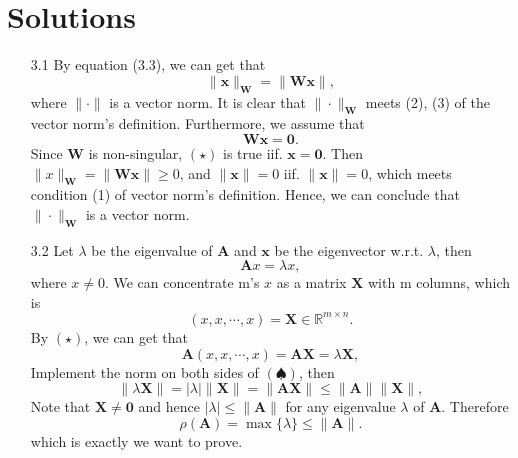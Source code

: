 \section{Solutions}
\begin{enumerate}
    \item[3.1] {
    By equation (3.3), we can get that
    $$
         \| \bm{x} \|_{\bm{W}} = \|\bm{Wx} \|,
    $$
    where $\| \cdot \|$ is a vector norm. It is clear that $\|\cdot \|_{\bm{W}}$ meets (2), (3) of the vector norm's definition. Furthermore, we assume that
    \begin{equation*}
    \bm{Wx} = \bm{0}.  \tag{$\star$}
    \end{equation*}
    }
    Since $\bm{W}$ is non-singular, $(\star)$ is true iif. $\bm{x} = \bm{0}$. Then $\| x\|_{\bm{W}} = \|\bm{Wx} \| \geq 0$, and $\| \bm{x} \|= 0 $ iif. $\| \bm{x} \| = 0$, which meets condition (1) of vector norm's definition. Hence, we can conclude that $\| \cdot \|_{\bm{W}}$ is a vector norm.

    \item[3.2] {
        Let $\lambda$ be the eigenvalue of $\bm{A}$ and $\bm{x}$ be the eigenvector w.r.t. $\lambda$, then
        \begin{equation*}
        \bm{A} x = \lambda x, \tag{$\star$}
        \end{equation*}
        where $x \neq 0$. We can concentrate m's $x$ as a matrix $\bm{X}$ with m columns, which is 
        $$
        (x, x, \cdots, x) = \bm{X} \in \mathbb{R}^{m \times n}.
        $$
        By $(\star)$, we can get that
        \begin{equation*}
            \bm{A} (x, x, \cdots, x)= \bm{A} \bm{X}=\lambda \bm{X}, \tag{$\spadesuit$}
        \end{equation*}
        Implement the norm on both sides of $(\spadesuit)$, then
        $$
        \| \lambda \bm{X} \| = | \lambda | \| \bm{X} \| = \| \bm{AX} \| \leq \| \bm{A} \| \|\bm{X} \|,
        $$
        Note that $\bm{X} \neq \bm{0}$ and hence $| \lambda | \leq \| \bm{A} \|$ for any eigenvalue $\lambda$ of $\bm{A}$. Therefore
        $$
        \rho(\bm{A}) = \max \{ \lambda \} \leq \| \bm{A} \|.
        $$
        which is exactly we want to prove.
    }   
\end{enumerate}
